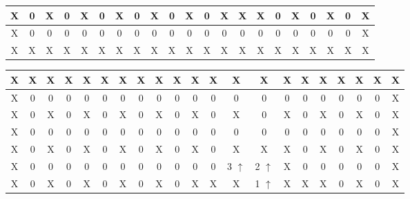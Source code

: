 \begin{center}
\begin{tabular}{|c|c|c|c|c|c|c|c|c|c|c|c|c|c|c|c|c|c|c|c|c|}
				\cellcolor{cyan}X & 0 & \cellcolor{cyan}X & 0 & \cellcolor{cyan}X & 0 & \cellcolor{cyan}X & 0 & \cellcolor{cyan}X & 0 & \cellcolor{cyan}X & 0 & \cellcolor{cyan}X & \cellcolor{cyan}X & \cellcolor{cyan}X & 0 & \cellcolor{cyan}X & 0 & \cellcolor{cyan}X & 0 & \cellcolor{cyan}X \\\hline
				\cellcolor{cyan}X & 0 & 0 & 0 & 0 & 0 & 0 & 0 & 0 & 0 & 0 & 0 & 0 & 0 & 0 & 0 & 0 & 0 & 0 & 0 &
				\cellcolor{cyan}X \\\hline \rowcolor{cyan}X & X & X & X & X & X & X & X & X & X & X & X & X & X & X & X & X & X & X & X & X \\\hline
				\end{tabular}
			\end{center}
			
			
			\begin{center}
				\begin{tabular}{|c|c|c|c|c|c|c|c|c|c|c|c|c|c|c|c|c|c|c|c|c|} \hline
				\rowcolor{cyan} X & X & X & X & X & X & X & X & X & X & X & X & X & X & X & X & X & X & X & X & X \\\hline
				\cellcolor{cyan}X & 0 & 0 & 0 & 0 & 0 & 0 & 0 & 0 & 0 & 0 & 0 & 0 & 0 & 0 & 0 & 0 & 0 & 0 & 0 & \cellcolor{cyan}X \\\hline
				\cellcolor{cyan}X & 0 & \cellcolor{cyan}\cellcolor{cyan}X & 0 & \cellcolor{cyan}X & 0 & \cellcolor{cyan}X & 0 & \cellcolor{cyan}X & 0 & \cellcolor{cyan}X & 0 & \cellcolor{cyan}X & 0 & \cellcolor{cyan}X &	0 & \cellcolor{cyan}X & 0 & \cellcolor{cyan}X & 0 & \cellcolor{cyan}X \\\hline
				\cellcolor{cyan}X & 0 & 0 & 0 & 0 & 0 & 0 & 0 & 0 & 0 & 0 & 0 & 0 & 0 & 0 & 0 & 0 & 0 & 0 & 0 & \cellcolor{cyan}X \\\hline
				\cellcolor{cyan}X & 0 & \cellcolor{cyan}X & 0 & \cellcolor{cyan}X & 0 & \cellcolor{cyan}X & 0 & \cellcolor{cyan}X & 0 & \cellcolor{cyan}X & 0 & \cellcolor{cyan}X & \cellcolor{cyan}X & \cellcolor{cyan}X & 0 & \cellcolor{cyan}X & 0 & \cellcolor{cyan}X & 0 & \cellcolor{cyan}X \\\hline
				\cellcolor{cyan}X & 0 & 0 & 0 & 0 & 0 & 0 & 0 & 0 & 0 & 0 & 0 & \cellcolor{green}3 $\uparrow$ & \cellcolor{orange}2 $\uparrow$ & \cellcolor{cyan}X & 0 & 0 & 0 & 0 & 0 & \cellcolor{cyan}X \\\hline
				\cellcolor{cyan}X & 0 & \cellcolor{cyan}X & 0 & \cellcolor{cyan}X & 0 & \cellcolor{cyan}X & 0 & \cellcolor{cyan}X & 0 & \cellcolor{cyan}X & \cellcolor{cyan}X & \cellcolor{cyan}X & \cellcolor{orange}1 $\uparrow$ & \cellcolor{cyan}X & \cellcolor{cyan}X & \cellcolor{cyan}X & 0 & \cellcolor{cyan}X & 0 & \cellcolor{cyan}X \\\hline

\end{tabular}
\end{center}
